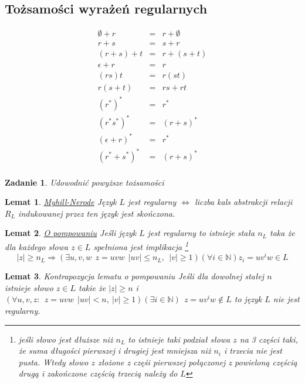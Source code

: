 \documentclass[12pt,a4paper]{article}
\newtheorem{lemat}{Lemat}
\newtheorem{zad}{Zadanie}
\theoremstyle{definition}
\theoremstyle{remark}
\begin{document}
	\subsection{Tożsamości wyrażeń regularnych}
	\begin{eqnarray}
		\emptyset + r &=& r + \emptyset \\
		r + s &=& s + r \\
		(r+s) + t &=& r + (s+t) \\
		\epsilon + r &=& r \\
		(rs)t &=& r(st) \\
		r(s+t) &=& rs + rt \\
		(r^*)^* &=& r^* \\
		(r^*s^*)^* &=& (r+s)^* \\
		(\epsilon + r)^* &=& r^* \\
		(r^* + s^*)^* &=& (r + s)^*\\		
	\end{eqnarray}
	
	\begin{zad}
		Udowodnić powyższe tożsamości
	\end{zad}
	
	\begin{lemat}{\href{http://pl.wikipedia.org/wiki/Twierdzenie_Myhilla-Nerode%27a}{Myhill-Nerode}}
		Język $L$ jest regularny $\Leftrightarrow$ liczba kals abstrakcji relacji $R_L$ indukowanej przez ten język jest skończona.
	\end{lemat}	
	
	\begin{lemat}{\href{http://pl.wikipedia.org/wiki/Lemat_o_pompowaniu_dla_j%C4%99zyk%C3%B3w_regularnych}{O pompowaniu}}
		Jeśli język $L$ jest regularny to istnieje stała $n_L$ taka że dla każdego słowa $z\in L$ spełniona jest implikacja
		\footnote{jeśli słowo jest dłuższe niż $n_L$ to istnieje taki podział słowa $z$ na 3 części taki, że suma długości pierwszej
		i drugiej jest mniejsza niż $n_i$ i trzecia nie jest pusta. Wtedy słowo $z$ złożone z częśi pierwszej połączonej z powieloną 
		częścią drugą i zakończone częścią trzecią należy do $L$}
		$$|z| \geqslant n_L \Rightarrow (\exists u,v,w ~~ z = uvw ~~ |uv| \leqslant n_L, ~~ |v| \geqslant 1)
		(\forall i\in\mathbb{N}) z_i = uv^iw \in L$$
	\end{lemat}
	
	\begin{lemat}{Kontrapozycja lematu o pompowaniu}
		Jeśli dla dowolnej stałej $n$ istnieje słowo $z\in L$ takie że 
		$|z|\geqslant n$ i $(\forall u,v,z: ~~ z = uvw ~~ |uv| < n, ~ |v| \geqslant 1)(\exists i\in\mathbb{N}) ~~ z = uv^iw \not\in L$
		to język $L$ nie jest regularny.
	\end{lemat}
\end{document}
